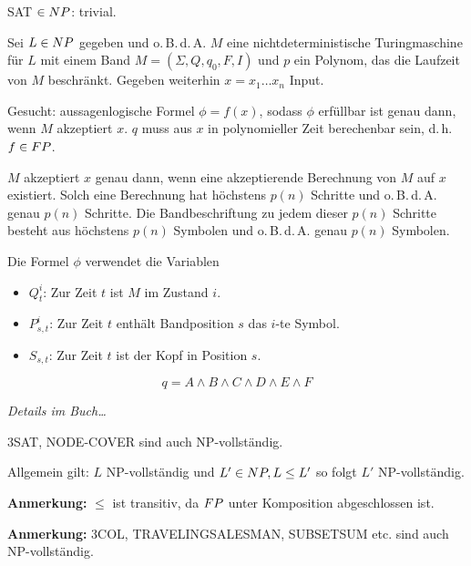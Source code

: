 \begin{beweis}
    
    SAT $\in NP$: trivial.

    Sei $L \in NP$ gegeben und o.\,B.\,d.\,A. $M$ eine nichtdeterministische Turingmaschine für $L$ mit einem Band $M = (\Sigma, Q, q_0, F, I)$ und $p$ ein Polynom, das die Laufzeit von $M$ beschränkt.
    Gegeben weiterhin $x = x_1 \dots x_n$ Input.

    Gesucht: aussagenlogische Formel $\phi = f(x)$, sodass $\phi$ erfüllbar ist genau dann, wenn $M$ akzeptiert $x$. $q$ muss aus $x$ in polynomieller Zeit berechenbar sein, d.\,h. $f \in FP$.

    $M$ akzeptiert $x$ genau dann, wenn eine akzeptierende Berechnung von $M$ auf $x$ existiert. Solch eine Berechnung hat höchstens $p(n)$ Schritte und o.\,B.\,d.\,A. genau $p(n)$ Schritte. Die Bandbeschriftung zu jedem dieser $p(n)$ Schritte besteht aus höchstens $p(n)$ Symbolen und o.\,B.\,d.\,A. genau $p(n)$ Symbolen.

    Die Formel $\phi$ verwendet die Variablen 
    \begin{itemize}
        \item $Q_t^i$: Zur Zeit $t$ ist $M$ im Zustand $i$.
        \item $P_{s,t}^i$: Zur Zeit $t$ enthält Bandposition $s$ das $i$-te Symbol.
        \item $S_{s,t}$: Zur Zeit $t$ ist der Kopf in Position $s$.
    \end{itemize}

    $$ q = A \land B \land C \land D \land E \land F $$

    \textit{Details im Buch\dots}

\end{beweis}


3SAT, NODE-COVER sind auch NP-vollständig.

Allgemein gilt: $L$ NP-vollständig und $L' \in NP, L \leq L'$ 
so folgt $L'$ NP-vollständig.


\textbf{Anmerkung:}
$\leq$ ist transitiv, da $FP$ unter Komposition abgeschlossen ist.

\textbf{Anmerkung:}
3COL, TRAVELINGSALESMAN, SUBSETSUM etc. sind auch NP-vollständig.












